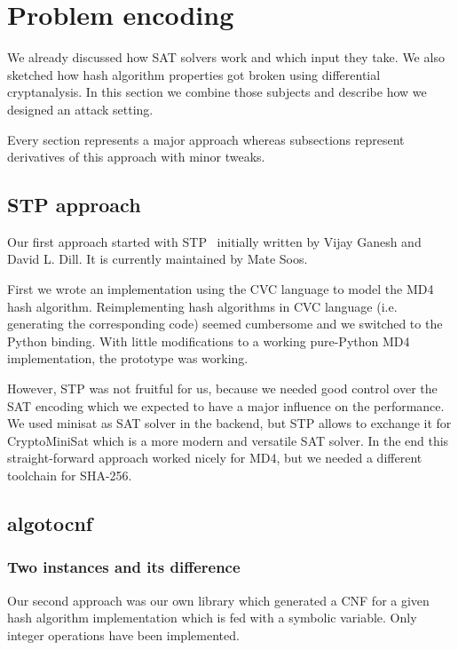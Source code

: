\renewcommand*\chappic{img/encoding.pdf}
\renewcommand*\chapquote{There is concensus that encoding techniques usually have a dramatic impact on the efficiency of the SAT solver}
\renewcommand*\chapquotesrc{Magnus Bj\"ork}
\chapter{Problem encoding}
\label{ch:enc}

We already discussed how SAT solvers work and which input they take.
We also sketched how hash algorithm properties got broken using
differential cryptanalysis. In this section we combine those
subjects and describe how we designed an attack setting.

Every section represents a major approach whereas subsections
represent derivatives of this approach with minor tweaks.

\section{STP approach}
\label{sec:enc-stp}
%
Our first approach started with STP~\cite{stp} initially written by Vijay Ganesh and David L. Dill.
It is currently maintained by Mate Soos.

First we wrote an implementation using the CVC language to model the MD4 hash algorithm.
Reimplementing hash algorithms in CVC language (i.e. generating the corresponding code)
seemed cumbersome and we switched to the Python binding. With little modifications to
a working pure-Python MD4 implementation, the prototype was working.

However, STP was not fruitful for us, because we needed good control over the SAT encoding
which we expected to have a major influence on the performance. We used minisat as SAT solver
in the backend, but STP allows to exchange it for CryptoMiniSat which is a more modern and
versatile SAT solver. In the end this straight-forward approach worked nicely for MD4,
but we needed a different toolchain for SHA-256.

\section{algotocnf}
\label{sec:enc-algotocnf}
%


\subsection{Two instances and its difference}
\label{sec:enc-original}
%
Our second approach was our own library which generated a CNF for a given hash algorithm
implementation which is fed with a symbolic variable. Only integer operations have been
implemented.

